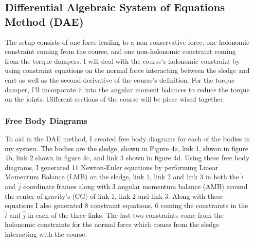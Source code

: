 \documentclass{article}
\begin{document}
\subsection{Differential Algebraic System of Equations Method (DAE)}
The setup consists of one force leading to a non-conservative force, one holonomic constraint coming from the course, and one non-holonomic constraint coming from the torque dampers. I will deal with the course's holonomic constraint by using constraint equations on the normal force interacting between the sledge and cart as well as the second derivative of the course's definition. For the torque damper, I’ll incorporate it into the angular moment balances to reduce the torque on the joints. Different sections of the course will be piece wised together. \\
\subsubsection{Free Body Diagrams}
To aid in the DAE method, I created free body diagrams for each of the bodies in my system. The bodies are the sledge, shown in Figure 4a, link 1, shwon in figure 4b, link 2 shown in figure 4c, and link 3 shown in figure 4d. Using these free body diagrams, I generated 11 Newton-Euler equations by performing Linear Momentum Balance (LMB) on the sledge, link 1, link 2 and link 3 in both the $\hat{i}$ and $\hat{j}$ coordinate frames along with 3 angular momentum balance (AMB) around the center of gravity's (CG) of link 1, link 2 and link 3. Along with these equations I also generated 8 constraint equations, 6 coming the constraints in the $\hat{i}$ and $\hat{j}$ in each of the three links. The last two constraints come from the holonomic constraints for the normal force which comes from the sledge interacting with the course.
\end{document}
